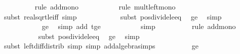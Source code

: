 \begin{isabellebody}
\ \ \ \ \ \ \ \ \isamarkupfalse%
\ {\isacharparenleft}{\kern0pt}rule\ add{\isacharunderscore}{\kern0pt}mono{\isacharparenright}{\kern0pt}\isanewline
\ \ \ \ \ \ \ \ \ \isamarkupfalse%
\ {\isacharparenleft}{\kern0pt}rule\ mult{\isacharunderscore}{\kern0pt}left{\isacharunderscore}{\kern0pt}mono{\isacharparenright}{\kern0pt}\isanewline
\ \ \ \ \ \ \ \ \ \ \isamarkupfalse%
\ {\isacharparenleft}{\kern0pt}subst\ real{\isacharunderscore}{\kern0pt}sqrt{\isacharunderscore}{\kern0pt}le{\isacharunderscore}{\kern0pt}iff{\isacharcomma}{\kern0pt}\ simp{\isacharparenright}{\kern0pt}\isanewline
\ \ \ \ \ \ \ \ \ \ \isamarkupfalse%
\ {\isacharparenleft}{\kern0pt}subst\ pos{\isacharunderscore}{\kern0pt}divide{\isacharunderscore}{\kern0pt}le{\isacharunderscore}{\kern0pt}eq{\isacharparenright}{\kern0pt}\ \isamarkupfalse%
\ {\isasymdelta}{\isacharprime}{\kern0pt}{\isacharunderscore}{\kern0pt}ge{\isacharunderscore}{\kern0pt}{}\ \isamarkupfalse%
\ simp\isanewline
\ \ \ \ \ \ \ \ \ \ \isamarkupfalse%
\ {\isasymdelta}{\isacharprime}{\kern0pt}{\isacharunderscore}{\kern0pt}ge{\isacharunderscore}{\kern0pt}{}\ \isamarkupfalse%
\ {\isacharparenleft}{\kern0pt}simp\ add{\isacharcolon}{\kern0pt}\ t{\isacharunderscore}{\kern0pt}ge{\isacharunderscore}{\kern0pt}{}{\isacharparenright}{\kern0pt}\isanewline
\ \ \ \ \ \ \ \ \ \isamarkupfalse%
\ simp\isanewline
\ \ \ \ \ \ \ \ \isamarkupfalse%
\ {\isacharparenleft}{\kern0pt}rule\ add{\isacharunderscore}{\kern0pt}mono{\isacharparenright}{\kern0pt}\isanewline
\ \ \ \ \ \ \ \ \ \isamarkupfalse%
\ {\isacharparenleft}{\kern0pt}subst\ pos{\isacharunderscore}{\kern0pt}divide{\isacharunderscore}{\kern0pt}le{\isacharunderscore}{\kern0pt}eq{\isacharparenright}{\kern0pt}\ \isamarkupfalse%
\ {\isasymdelta}{\isacharprime}{\kern0pt}{\isacharunderscore}{\kern0pt}ge{\isacharunderscore}{\kern0pt}{}\ \isamarkupfalse%
\ simp\isanewline
\ \ \ \ \ \ \ \ \ \isamarkupfalse%
\ {\isacharparenleft}{\kern0pt}subst\ left{\isacharunderscore}{\kern0pt}diff{\isacharunderscore}{\kern0pt}distrib{\isacharcomma}{\kern0pt}\ simp{\isacharcomma}{\kern0pt}\ simp\ add{\isacharcolon}{\kern0pt}algebra{\isacharunderscore}{\kern0pt}simps{\isacharparenright}{\kern0pt}\isanewline
\ \ \ \ \ \ \ \ \isamarkupfalse%
\ {\isasymdelta}{\isacharprime}{\kern0pt}{\isacharunderscore}{\kern0pt}ge{\isacharunderscore}{\kern0pt}{}\ \isamarkupfalse%

\end{isabellebody}
